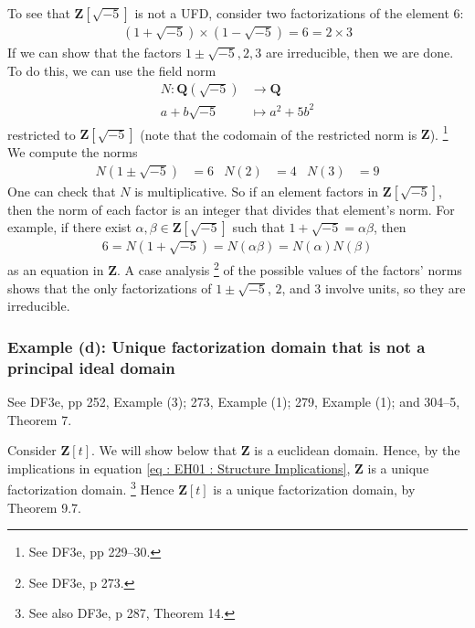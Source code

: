 \documentclass[oneside, english, 11pt]{article}
\newcommand{\integers}{\mathbf{Z}}
\newcommand{\Q}{\rationals}
\newcommand{\rationals}{\mathbf{Q}}
\newcommand{\Z}{\integers}
\begin{document}
{To see that $\Z[\sqrt{-5}]$ is not a UFD, consider two factorizations of the element $6$:
\begin{align*}
(1 + \sqrt{-5}) \times (1 - \sqrt{-5})
=
6
=
2 \times 3
\end{align*}
If we can show that the factors $1 \pm{} \sqrt{-5}, 2, 3$ are irreducible, then we are done. To do this, we can use the field norm
\begin{align*}
N : \Q(\sqrt{-5}) &\rightarrow \Q
\\
a + b \sqrt{-5}
&\mapsto
a^{2} + 5 b^{2}
\end{align*}
restricted to $\Z[\sqrt{-5}]$ (note that the codomain of the restricted norm is $\Z$).%
\footnote{See DF3e, pp 229--30.} %
We compute the norms
\begin{align*}
N(1 \pm{} \sqrt{-5})
&=
6
&
N(2)
&=
4
&
N(3)
&=
9
\end{align*}
One can check that $N$ is multiplicative. So if an element factors in $\Z[\sqrt{-5}]$, then the norm of each factor is an integer that divides that element's norm. For example, if there exist $\alpha, \beta \in \Z[\sqrt{-5}]$ such that $1 + \sqrt{-5} = \alpha \beta$, then
\begin{align*}
6
=
N(1 + \sqrt{-5})
=
N(\alpha \beta)
=
N(\alpha) N(\beta)
\end{align*}
as an equation in $\Z$. A case analysis%
\footnote{See DF3e, p 273.} %
of the possible values of the factors' norms shows that the only factorizations of $1 \pm{} \sqrt{-5}$, $2$, and $3$ involve units, so they are irreducible.



\subsubsection*{Example (d): Unique factorization domain that is not a principal ideal domain}

See DF3e, pp 252, Example (3); 273, Example (1); 279, Example (1); and 304--5, Theorem 7.

Consider $\Z[t]$. We will show below that $\Z$ is a euclidean domain. Hence, by the implications in equation \eqref{eq : EH01 : Structure Implications}, $\Z$ is a unique factorization domain.%
\footnote{See also DF3e, p 287, Theorem 14.} %
Hence $\Z[t]$ is a unique factorization domain, by Theorem 9.7.

}
\end{document}
